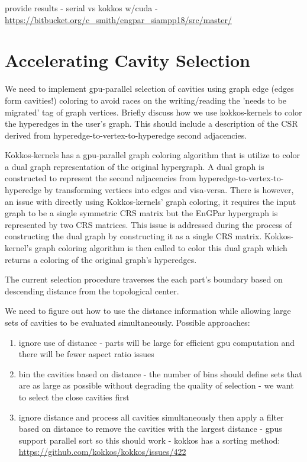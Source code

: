 \documentclass[graybox]{svmult}
\begin{document}
provide results - serial vs kokkos w/cuda -
\url{https://bitbucket.org/c_smith/engpar_siampp18/src/master/}

\section{Accelerating Cavity Selection} \label{sec:select}

We need to implement gpu-parallel selection of cavities using graph edge (edges
form cavities!) coloring to avoid races on the writing/reading the 'needs to be
migrated' tag of graph vertices.
Briefly discuss how we use kokkos-kernels to color the hyperedges in the user's graph.
This should include a description of the CSR derived from hyperedge-to-vertex-to-hyperedge
second adjacencies.

Kokkos-kernels has a gpu-parallel graph coloring algorithm that is utilize to
color a dual graph representation of the original hypergraph.
A dual graph is constructed to represent the second adjacencies from
hyperedge-to-vertex-to-hyperedge by transforming vertices into edges and
visa-versa.
There is however, an issue with directly using Kokkos-kernels' graph coloring,
it requires the input graph to be a single symmetric CRS matrix but the EnGPar
hypergraph is represented by two CRS matrices.
This issue is addressed during the process of constructing the dual graph by
constructing it as a single CRS matrix.
Kokkos-kernel's graph coloring algorithm is then called to color this dual graph
which returns a coloring of the original graph's hyperedges.

The current selection procedure traverses the each part's boundary based on
descending distance from the topological center.

We need to figure out how to use the distance information while allowing large
sets of cavities to be evaluated simultaneously.
Possible approaches:
\begin{enumerate}
  \item ignore use of distance - parts will be large for efficient gpu
    computation and there will be fewer aspect ratio issues
  \item bin the cavities based on distance - the number of bins should define
    sets that are as large as possible without degrading the quality of
    selection - we want to select the close cavities first
  \item ignore distance and process all cavities simultaneously then apply a
    filter based on distance to remove the cavities with the largest distance -
    gpus support parallel sort so this should work - kokkos has a sorting
    method:
    \url{https://github.com/kokkos/kokkos/issues/422} \label{sortingSelect}
\end{enumerate}
\end{document}
